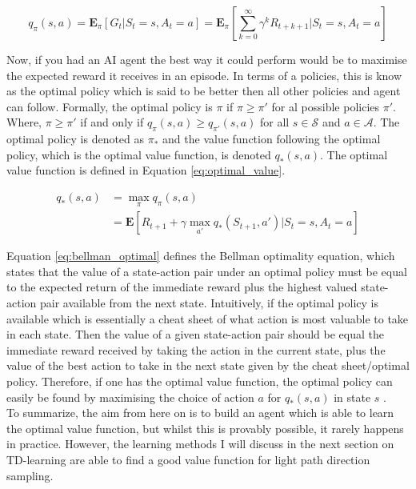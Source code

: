 \documentclass[../dissertation.tex]{subfiles}
\begin{document}
\begin{equation}
\label{eq:value_function}
q_\pi(s, a) = \mathbf{E}_\pi[G_t | S_t = s, A_t = a] = \mathbf{E}_\pi [\sum_{k=0}^{\infty} \gamma^k R_{t+k+1} | S_t = s, A_t = a]
\end{equation}

Now, if you had an AI agent the best way it could perform would be to maximise the expected reward it receives in an episode. In terms of a policies, this is know as the optimal policy which is said to be better then all other policies and agent can follow. Formally, the optimal policy is $\pi$ if $\pi \geq \pi'$ for al possible policies $\pi'$. Where, $\pi \geq \pi'$ if and only if $q_\pi(s,a) \geq q_{\pi'}(s,a)$ for all $s \in \mathcal{S}$ and $a \in \mathcal{A}$. The optimal policy is denoted as $\pi_*$ and the value function following the optimal policy, which is the optimal value function, is denoted $q_*(s,a)$. The optimal value function is defined in Equation \ref{eq:optimal_value}.

\begin{align}
q_*(s,a) & = \max_\pi q_\pi(s,a) \label{eq:optimal_value} \\
 & = \mathbf{E}[R_{t+1} + \gamma \max_{a'} q_* (S_{t+1}, a') | S_t = s, A_t = a]  \label{eq:bellman_optimal}
\end{align}

Equation \ref{eq:bellman_optimal} defines the Bellman optimality equation, which states that the value of a state-action pair under an optimal policy must be equal to the expected return of the immediate reward plus the highest valued state-action pair available from the next state. Intuitively, if the optimal policy is available which is essentially a cheat sheet of what action is most valuable to take in each state. Then the value of a given state-action pair should be equal the immediate reward received by taking the action in the current state, plus the value of the best action to take in the next state given by the cheat sheet/optimal policy. Therefore, if one has the optimal value function, the optimal policy can easily be found by maximising the choice of action $a$ for $q_*(s,a)$  in state $s$ \cite{sutton2011reinforcement}. \\ 

To summarize, the aim from here on is to build an agent which is able to learn the optimal value function, but whilst this is provably possible, it rarely happens in practice. However, the learning methods I will discuss in the next section on TD-learning are able to find a good value function for light path direction sampling.
\end{document}
